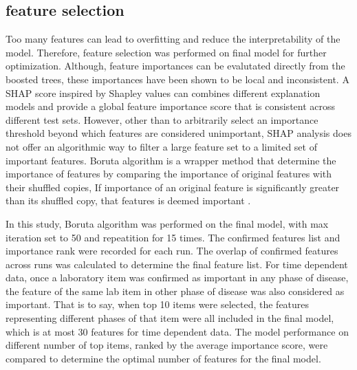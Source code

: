 \documentclass[final,3p,times,authoryear]{elsarticle}
\begin{document}
\subsection{feature selection}\label{FeatureSelection}

Too many features can lead to overfitting and reduce the interpretability of the model. Therefore, feature selection was performed on final model for further optimization. Although, feature importances can be evalutated directly from the boosted trees, these importances have been shown to be local and inconsistent. A SHAP score inspired by Shapley values can combines different explanation models and provide a global feature importance score that is consistent across different test sets. However, other than to arbitrarily select an importance threshold beyond which features are considered unimportant, SHAP analysis does not offer an algorithmic way to filter a large feature set to a limited set of important features. Boruta algorithm is a wrapper method that determine the importance of features by comparing the importance of original features with their shuffled copies, If importance of an original feature is significantly greater than its shuffled copy, that features is deemed important \citep{kursa2010feature}.

In this study, Boruta algorithm was performed on the final model, with max iteration set to 50 and repeatition for 15 times. The confirmed features list and importance rank were recorded for each run. The overlap of confirmed features across runs was calculated to determine the final feature list. For time dependent data, once a laboratory item was confirmed as important in any phase of disease, the feature of the same lab item in other phase of disease was also considered as important. That is to say, when top 10 items were selected, the features representing different phases of that item were all included in the final model, which is at most 30 features for time dependent data. The model performance on different number of top items, ranked by the average importance score, were compared to determine the optimal number of features for the final model.
\end{document}
